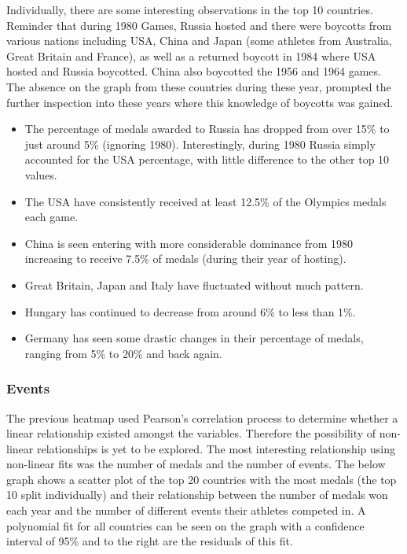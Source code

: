 \documentclass[a4 paper, 12pt]{article}
\begin{document}
        Individually, there are some interesting observations in the top 10 countries. Reminder that during 1980 Games, Russia hosted and there were boycotts from various nations including USA, China and Japan (some athletes from Australia, Great Britain and France), as well as a returned boycott in 1984 where USA hosted and Russia boycotted. China also boycotted the 1956 and 1964 games. The absence on the graph from these countries during these year, prompted the further inspection into these years where this knowledge of boycotts was gained.
        \begin{itemize}
            \item The percentage of medals awarded to Russia has dropped from over 15\% to just around 5\% (ignoring 1980). Interestingly, during 1980 Russia simply accounted for the USA percentage, with little difference to the other top 10 values.
            \item The USA have consistently received at least 12.5\% of the Olympics medals each game.
            \item China is seen entering with more considerable dominance from 1980 increasing to receive 7.5\% of medals (during their year of hosting).
            \item Great Britain, Japan and Italy have fluctuated without much pattern.
            \item Hungary has continued to decrease from around 6\% to less than 1\%.
            \item Germany has seen some drastic changes in their percentage of medals, ranging from 5\% to 20\% and back again. 
        \end{itemize}          


        \subsubsection{Events}
        The previous heatmap used Pearson's correlation process to determine whether a linear relationship existed amongst the variables. Therefore the possibility of non-linear relationships is yet to be explored. The most interesting relationship using non-linear fits was the number of medals and the number of events. The below graph shows a scatter plot of the top 20 countries with the most medals (the top 10 split individually) and their relationship between the number of medals won each year and the number of different events their athletes competed in. A polynomial fit for all countries can be seen on the graph with a confidence interval of 95\% and to the right are the residuals of this fit.  
\end{document}
